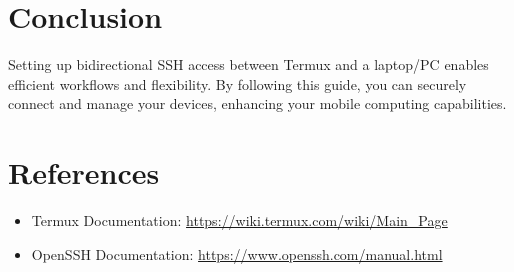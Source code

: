 \documentclass[conference]{IEEEtran}
\begin{document}
\section{Conclusion}
Setting up bidirectional SSH access between Termux and a laptop/PC enables efficient workflows and flexibility. By following this guide, you can securely connect and manage your devices, enhancing your mobile computing capabilities.

\section{References}
\begin{itemize}[leftmargin=*]
    \item Termux Documentation: \url{https://wiki.termux.com/wiki/Main_Page}
    \item OpenSSH Documentation: \url{https://www.openssh.com/manual.html}
\end{itemize}
\end{document}

